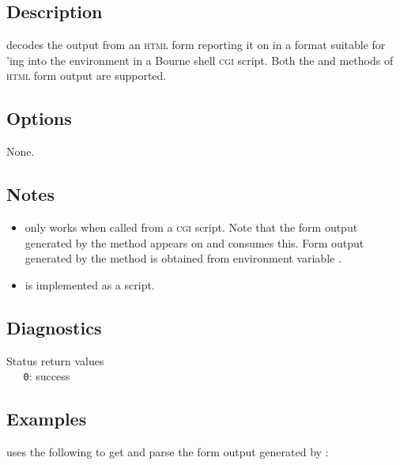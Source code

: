 \begin{synopsis}
\end{synopsis}
 
\subsection*{Description}
 
 decodes the output from an \textsc{html} form reporting it on
 in a format suitable for 'ing into the environment
in a Bourne shell \textsc{cgi} script.  Both the  and 
methods of \textsc{html} form output are supported.
 
\subsection*{Options}
 
None.
 
\subsection*{Notes}
 
\begin{itemize}
\item
    only works when called from a \textsc{cgi} script.  Note
   that the form output generated by the  method appears on
    and  consumes this.  Form output generated by
   the  method is obtained from environment variable
   .

\item
    is implemented as a  script.
\end{itemize}
 
\subsection*{Diagnostics}
 
Status return values
\\ \verb+   0+: success

\subsection*{Examples}

 uses the following to get and parse the form output generated
by :


